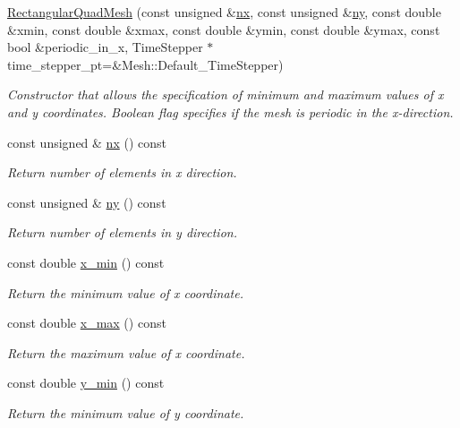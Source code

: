 \begin{DoxyCompactItemize}
\hyperlink{classoomph_1_1RectangularQuadMesh_ac36869a7d72ec7524b18272657cb6167}{Rectangular\+Quad\+Mesh} (const unsigned \&\hyperlink{classoomph_1_1RectangularQuadMesh_abfef93d6322886cdce14a437186e4821}{nx}, const unsigned \&\hyperlink{classoomph_1_1RectangularQuadMesh_a86d76a55eb7c4e8bca9b74d23c8b0412}{ny}, const double \&xmin, const double \&xmax, const double \&ymin, const double \&ymax, const bool \&periodic\+\_\+in\+\_\+x, Time\+Stepper $\ast$time\+\_\+stepper\+\_\+pt=\&Mesh\+::\+Default\+\_\+\+Time\+Stepper)
\begin{DoxyCompactList}\small\item\em Constructor that allows the specification of minimum and maximum values of x and y coordinates. Boolean flag specifies if the mesh is periodic in the x-\/direction. \end{DoxyCompactList}\item 
const unsigned \& \hyperlink{classoomph_1_1RectangularQuadMesh_abfef93d6322886cdce14a437186e4821}{nx} () const
\begin{DoxyCompactList}\small\item\em Return number of elements in x direction. \end{DoxyCompactList}\item 
const unsigned \& \hyperlink{classoomph_1_1RectangularQuadMesh_a86d76a55eb7c4e8bca9b74d23c8b0412}{ny} () const
\begin{DoxyCompactList}\small\item\em Return number of elements in y direction. \end{DoxyCompactList}\item 
const double \hyperlink{classoomph_1_1RectangularQuadMesh_ab311c3bec7f9f721bae1f93e0798ab2c}{x\+\_\+min} () const
\begin{DoxyCompactList}\small\item\em Return the minimum value of x coordinate. \end{DoxyCompactList}\item 
const double \hyperlink{classoomph_1_1RectangularQuadMesh_a3449b36a5e4fc4728e517bd38d7b0cc6}{x\+\_\+max} () const
\begin{DoxyCompactList}\small\item\em Return the maximum value of x coordinate. \end{DoxyCompactList}\item 
const double \hyperlink{classoomph_1_1RectangularQuadMesh_a1c493af1dae35746bed7a31e61b46c5b}{y\+\_\+min} () const
\begin{DoxyCompactList}\small\item\em Return the minimum value of y coordinate. \end{DoxyCompactList}\item 

\end{DoxyCompactItemize}
